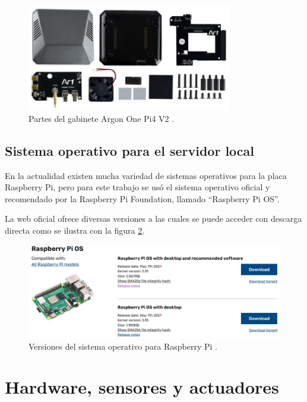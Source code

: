 \begin{figure}[htpb]
\centering 
\includegraphics[width=0.8\textwidth]{./Figures/argon2.jpg}
\caption{Partes del gabinete Argon One Pi4 V2 \protect\footnotemark.}
\label{fig:armado}
\end{figure}

\subsection{Sistema operativo para el servidor local}

En la actualidad existen mucha variedad de sistemas operativos para la placa Raspberry Pi, pero para este trabajo se usó el sistema operativo oficial y recomendado por la Raspberry Pi Foundation, llamado ``Raspberry Pi OS''.

La web oficial ofrece diversas versiones a las cuales se puede acceder con descarga directa como se ilustra con la figura \ref{fig:so}.

\begin{figure}[htbp]
	\centering
	\includegraphics[width=1.0\textwidth]{./Figures/so.png}
	\caption{Versiones del sistema operativo para Raspberry Pi \protect\footnotemark.}
	\label{fig:so}
\end{figure}

\section{Hardware, sensores y actuadores}

